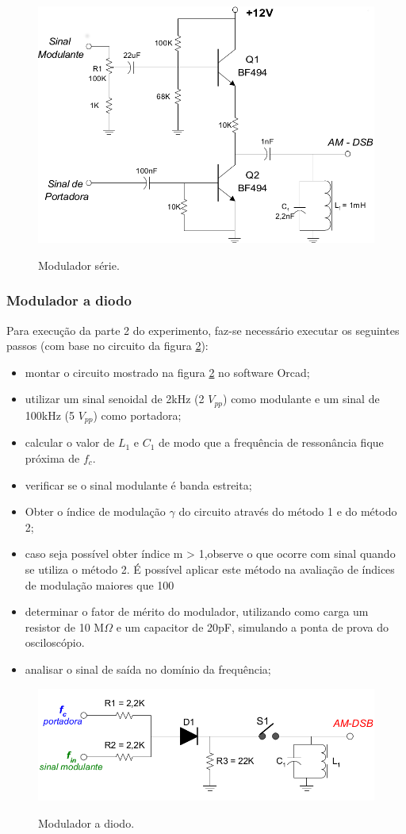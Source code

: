 \begin{figure}[H]
\centering
\caption{Modulador série.}
\includegraphics[scale=0.4]{Imagens/sch_mod_am_serie.png}
\label{f_sch_mod_am_serie}
\end{figure}

\subsubsection{Modulador a diodo}
Para execução da parte 2 do experimento, faz-se necessário executar os seguintes passos (com base no circuito da figura \ref{f_sch_mod_am_diodo}):

\begin{itemize}
\item montar o circuito mostrado na figura \ref{f_sch_mod_am_diodo} no software Orcad;
\item utilizar um sinal senoidal de 2kHz (2 $V_{pp}$) como modulante e um sinal de 100kHz (5 $V_{pp}$) como portadora;
\item calcular o valor de $L_1$ e $C_1$ de modo que a frequência de ressonância fique próxima de $f_c$.
\item verificar se o sinal modulante é banda estreita;
\item Obter o índice de modulação $\gamma$ do circuito através do método 1 e do método 2;
\item caso seja possível obter índice m > 1,observe o que ocorre com sinal quando se utiliza o método 2. É possível aplicar este método na avaliação de índices de modulação maiores que 100%
\item determinar o fator de mérito do modulador, utilizando como carga um resistor de 10 M$\Omega$ e um capacitor de 20pF, simulando a ponta de prova do osciloscópio.
\item analisar o sinal de saída no domínio da frequência;
\end{itemize}

\begin{figure}[H]
    \centering
    \caption{Modulador a diodo.}
    \includegraphics[scale=0.5]{Imagens/sch_mod_am_diodo.png}
    \label{f_sch_mod_am_diodo}
\end{figure}

